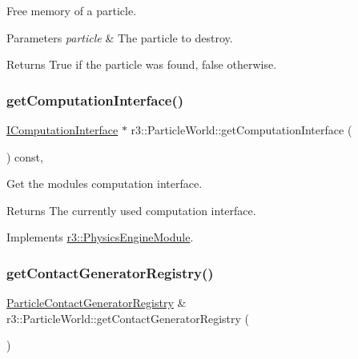 Free memory of a particle. 


\begin{DoxyParams}{Parameters}
{\em particle} & The particle to destroy. \\
\hline
\end{DoxyParams}
\begin{DoxyReturn}{Returns}
True if the particle was found, false otherwise. 
\end{DoxyReturn}
\mbox{\label{classr3_1_1_particle_world_a1e806bf89ec6445a54b9534f1efc081f}} 
\subsubsection{\texorpdfstring{get\+Computation\+Interface()}{getComputationInterface()}}
{\footnotesize\ttfamily \mbox{\hyperlink{classr3_1_1_i_computation_interface}{I\+Computation\+Interface}} $\ast$ r3\+::\+Particle\+World\+::get\+Computation\+Interface (\begin{DoxyParamCaption}{ }\end{DoxyParamCaption}) const\hspace{0.3cm}{\ttfamily [override]}, {\ttfamily [virtual]}}



Get the module\textquotesingle{}s computation interface. 

\begin{DoxyReturn}{Returns}
The currently used computation interface. 
\end{DoxyReturn}


Implements \mbox{\hyperlink{classr3_1_1_physics_engine_module_a3b1d0d9bea0a82534f367f6d728312d3}{r3\+::\+Physics\+Engine\+Module}}.

\mbox{\label{classr3_1_1_particle_world_a85fc9fcf5c51a5bbce206a35a82f8ccf}} 
\subsubsection{\texorpdfstring{get\+Contact\+Generator\+Registry()}{getContactGeneratorRegistry()}\hspace{0.1cm}{\footnotesize\ttfamily [1/2]}}
{\footnotesize\ttfamily \mbox{\hyperlink{classr3_1_1_particle_contact_generator_registry}{Particle\+Contact\+Generator\+Registry}} \& r3\+::\+Particle\+World\+::get\+Contact\+Generator\+Registry (\begin{DoxyParamCaption}{ }\end{DoxyParamCaption})}



